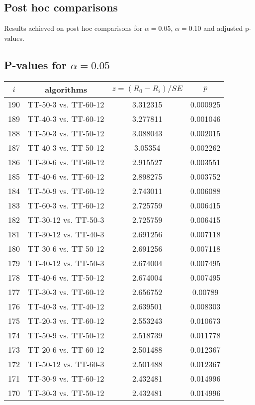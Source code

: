 \documentclass[a4paper,10pt]{article}
\begin{document}
\begin{landscape}
\section{Post hoc comparisons}

Results achieved on post hoc comparisons for $\alpha = 0.05$, $\alpha = 0.10$ and adjusted p-values.

\subsection{P-values for $\alpha=0.05$}

\begin{table}[!htp]
\centering\scriptsize
\begin{tabular}{cccc}
$i$&algorithms&$z=(R_0 - R_i)/SE$&$p$\\
\hline190&TT-50-3 vs. TT-60-12&3.312315&0.000925\\
189&TT-40-3 vs. TT-60-12&3.277811&0.001046\\
188&TT-50-3 vs. TT-50-12&3.088043&0.002015\\
187&TT-40-3 vs. TT-50-12&3.05354&0.002262\\
186&TT-30-6 vs. TT-60-12&2.915527&0.003551\\
185&TT-40-6 vs. TT-60-12&2.898275&0.003752\\
184&TT-50-9 vs. TT-60-12&2.743011&0.006088\\
183&TT-60-3 vs. TT-60-12&2.725759&0.006415\\
182&TT-30-12 vs. TT-50-3&2.725759&0.006415\\
181&TT-30-12 vs. TT-40-3&2.691256&0.007118\\
180&TT-30-6 vs. TT-50-12&2.691256&0.007118\\
179&TT-40-12 vs. TT-50-3&2.674004&0.007495\\
178&TT-40-6 vs. TT-50-12&2.674004&0.007495\\
177&TT-30-3 vs. TT-60-12&2.656752&0.00789\\
176&TT-40-3 vs. TT-40-12&2.639501&0.008303\\
175&TT-20-3 vs. TT-60-12&2.553243&0.010673\\
174&TT-50-9 vs. TT-50-12&2.518739&0.011778\\
173&TT-20-6 vs. TT-60-12&2.501488&0.012367\\
172&TT-50-12 vs. TT-60-3&2.501488&0.012367\\
171&TT-30-9 vs. TT-60-12&2.432481&0.014996\\
170&TT-30-3 vs. TT-50-12&2.432481&0.014996\\

\end{tabular}
\end{table}
\end{landscape}
\end{document}
